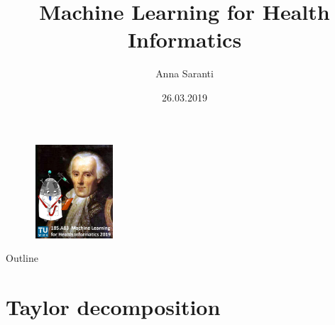 \documentclass{beamer}
\title[Layer-wise Relevance Propagation (LRP) algorithm]{Machine Learning for Health Informatics}
\author{Anna Saranti}
\institute{Holzinger Group hci-kdd.org}
\date{26.03.2019}
\begin{document}
\begin{frame}
  \titlepage
  
  \begin{figure}[ht]
	\centering
    \includegraphics[width=3cm, height=3.5cm]{figures/HddKciLogo}
	\label{fig:HddKciLogo}
  \end{figure}
  
\end{frame}

\begin{frame}{Outline}
  \tableofcontents
\end{frame}

\section{Taylor decomposition}
\end{document}
